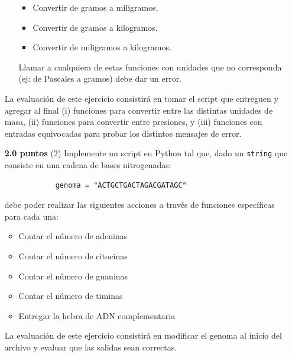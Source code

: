 \documentclass{article}
\begin{document}
\begin{itemize}
\begin{itemize}
\begin{itemize}
                    \item Convertir de gramos a miligramos.
                    \item Convertir de gramos a kilogramos.
                    \item Convertir de miligramos a kilogramos.
                \end{itemize}
                Llamar a cualquiera de estas funciones con unidades que no corresponda (ej: de Pascales a gramos) debe dar un error. 
        \end{itemize}
    La evaluación de este ejercicio consistirá en tomar el script que entreguen y agregar al final (i) funciones para convertir entre las distintas unidades de masa, (ii) funciones para convertir entre presiones, y (iii) funciones con entradas equivocadas para probar los distintos mensajes de error. 
    \item[\textbf{2.0 puntos} (2)] Implemente un script en Python tal que, dado un \texttt{string} que consiste en una cadena de bases nitrogenadas:
        \begin{verbatim}
            genoma = "ACTGCTGACTAGACGATAGC"
        \end{verbatim}
    debe poder realizar las siguientes acciones a través de funciones específicas para cada una: 
        \begin{itemize}
            \item Contar el número de adeninas
            \item Contar el número de citocinas
            \item Contar el número de guaninas
            \item Contar el número de timinas
            \item Entregar la hebra de ADN complementaria
        \end{itemize}
    La evaluación de este ejercicio consistirá en modificar el genoma al inicio del archivo y evaluar que las salidas sean correctas. 
    

\end{itemize}
\end{document}
